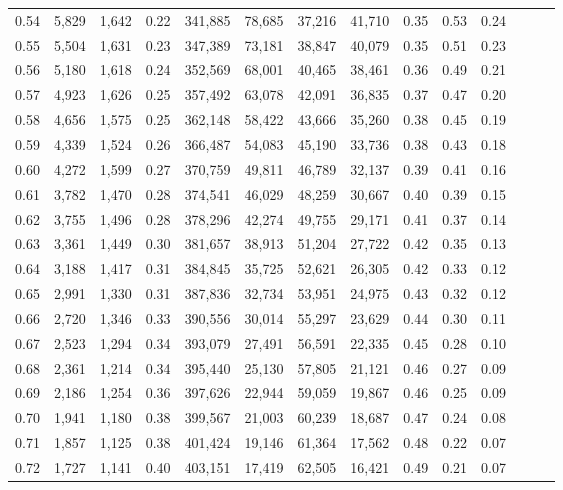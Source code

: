 \begin{tabular}{rrrrrrrrrrrrrr}
0.54 &  5,829 &  1,642 &  0.22 &  341,885 &   78,685 &  37,216 &  41,710 &  0.35 &  0.53 &      0.24 \\
0.55 &  5,504 &  1,631 &  0.23 &  347,389 &   73,181 &  38,847 &  40,079 &  0.35 &  0.51 &      0.23 \\
0.56 &  5,180 &  1,618 &  0.24 &  352,569 &   68,001 &  40,465 &  38,461 &  0.36 &  0.49 &      0.21 \\
0.57 &  4,923 &  1,626 &  0.25 &  357,492 &   63,078 &  42,091 &  36,835 &  0.37 &  0.47 &      0.20 \\
0.58 &  4,656 &  1,575 &  0.25 &  362,148 &   58,422 &  43,666 &  35,260 &  0.38 &  0.45 &      0.19 \\
0.59 &  4,339 &  1,524 &  0.26 &  366,487 &   54,083 &  45,190 &  33,736 &  0.38 &  0.43 &      0.18 \\
0.60 &  4,272 &  1,599 &  0.27 &  370,759 &   49,811 &  46,789 &  32,137 &  0.39 &  0.41 &      0.16 \\
0.61 &  3,782 &  1,470 &  0.28 &  374,541 &   46,029 &  48,259 &  30,667 &  0.40 &  0.39 &      0.15 \\
0.62 &  3,755 &  1,496 &  0.28 &  378,296 &   42,274 &  49,755 &  29,171 &  0.41 &  0.37 &      0.14 \\
0.63 &  3,361 &  1,449 &  0.30 &  381,657 &   38,913 &  51,204 &  27,722 &  0.42 &  0.35 &      0.13 \\
0.64 &  3,188 &  1,417 &  0.31 &  384,845 &   35,725 &  52,621 &  26,305 &  0.42 &  0.33 &      0.12 \\
0.65 &  2,991 &  1,330 &  0.31 &  387,836 &   32,734 &  53,951 &  24,975 &  0.43 &  0.32 &      0.12 \\
0.66 &  2,720 &  1,346 &  0.33 &  390,556 &   30,014 &  55,297 &  23,629 &  0.44 &  0.30 &      0.11 \\
0.67 &  2,523 &  1,294 &  0.34 &  393,079 &   27,491 &  56,591 &  22,335 &  0.45 &  0.28 &      0.10 \\
0.68 &  2,361 &  1,214 &  0.34 &  395,440 &   25,130 &  57,805 &  21,121 &  0.46 &  0.27 &      0.09 \\
0.69 &  2,186 &  1,254 &  0.36 &  397,626 &   22,944 &  59,059 &  19,867 &  0.46 &  0.25 &      0.09 \\
0.70 &  1,941 &  1,180 &  0.38 &  399,567 &   21,003 &  60,239 &  18,687 &  0.47 &  0.24 &      0.08 \\
0.71 &  1,857 &  1,125 &  0.38 &  401,424 &   19,146 &  61,364 &  17,562 &  0.48 &  0.22 &      0.07 \\
0.72 &  1,727 &  1,141 &  0.40 &  403,151 &   17,419 &  62,505 &  16,421 &  0.49 &  0.21 &      0.07 \\

\end{tabular}
